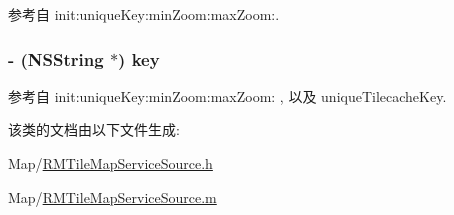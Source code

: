 参考自 init\-:unique\-Key\-:min\-Zoom\-:max\-Zoom\-:.

\hypertarget{interface_r_m_tile_map_service_source_a151b46ddcc1398eecd233de4d269946f}{
\subsubsection[{key}]{\setlength{\rightskip}{0pt plus 5cm}-\/ (N\-S\-String $\ast$) key\hspace{0.3cm}{\ttfamily [protected]}}}\label{interface_r_m_tile_map_service_source_a151b46ddcc1398eecd233de4d269946f}


参考自 init\-:unique\-Key\-:min\-Zoom\-:max\-Zoom\-: , 以及 unique\-Tilecache\-Key.



该类的文档由以下文件生成\-:\begin{DoxyCompactItemize}
\item 
Map/\hyperlink{_r_m_tile_map_service_source_8h}{R\-M\-Tile\-Map\-Service\-Source.\-h}\item 
Map/\hyperlink{_r_m_tile_map_service_source_8m}{R\-M\-Tile\-Map\-Service\-Source.\-m}\end{DoxyCompactItemize}
